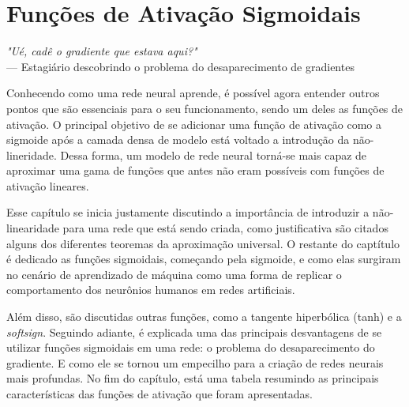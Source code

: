 
\chapter{Funções de Ativação Sigmoidais}
\label{cap:ativacao-sigmoidais}



\begin{flushright}
\textit{"Ué, cadê o gradiente que estava aqui?"} \\
--- Estagiário descobrindo o problema do desaparecimento de gradientes
\end{flushright}

Conhecendo como uma rede neural aprende, é possível agora entender outros pontos que são essenciais para o seu funcionamento, sendo um deles as funções de ativação. O principal objetivo de se adicionar uma função de ativação como a sigmoide após a camada densa de modelo está voltado a introdução da não-lineridade. Dessa forma, um modelo de rede neural torná-se mais capaz de aproximar uma gama de funções que antes não eram possíveis com funções de ativação lineares.

Esse capítulo se inicia justamente discutindo a importância de introduzir a não-linearidade para uma rede que está sendo criada, como justificativa são citados alguns dos diferentes teoremas da aproximação universal. O restante do captítulo é dedicado as funções sigmoidais, começando pela sigmoide, e como elas surgiram no cenário de aprendizado de máquina como uma forma de replicar o comportamento dos neurônios humanos em redes artificiais. 

Além disso, são discutidas outras funções, como a tangente hiperbólica (tanh) e a \textit{softsign}. Seguindo adiante, é explicada uma das principais desvantagens de se utilizar funções sigmoidais em uma rede: o problema do desaparecimento do gradiente. E como ele se tornou um empecilho para a criação de redes neurais mais profundas. No fim do capítulo, está uma tabela resumindo as principais características das funções de ativação que foram apresentadas.

